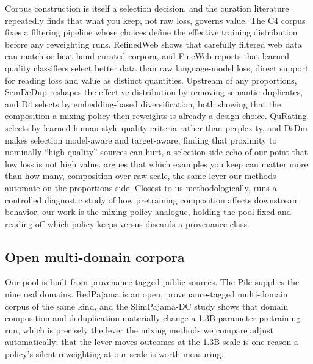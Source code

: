 \documentclass{article}
\begin{document}
Corpus construction is itself a selection decision, and the curation literature repeatedly finds that what you keep, not raw loss, governs value. The C4 corpus \citep{raffel2020t5} fixes a filtering pipeline whose choices define the effective training distribution before any reweighting runs. RefinedWeb \citep{penedo2023refinedweb} shows that carefully filtered web data can match or beat hand-curated corpora, and FineWeb \citep{penedo2024fineweb} reports that learned quality classifiers select better data than raw language-model loss, direct support for reading loss and value as distinct quantities. Upstream of any proportions, SemDeDup \citep{abbas2023semdedup} reshapes the effective distribution by removing semantic duplicates, and D4 \citep{tirumala2023d4} selects by embedding-based diversification, both showing that the composition a mixing policy then reweights is already a design choice. QuRating \citep{wettig2024qurating} selects by learned human-style quality criteria rather than perplexity, and DsDm \citep{engstrom2024dsdm} makes selection model-aware and target-aware, finding that proximity to nominally ``high-quality'' sources can hurt, a selection-side echo of our point that low loss is not high value. \citet{sorscher2022pruning} argues that which examples you keep can matter more than how many, composition over raw scale, the same lever our methods automate on the proportions side. Closest to us methodologically, \citet{longpre2024pretrainersguide} runs a controlled diagnostic study of how pretraining composition affects downstream behavior; our work is the mixing-policy analogue, holding the pool fixed and reading off which policy keeps versus discards a provenance class.

\subsection{Open multi-domain corpora}

Our pool is built from provenance-tagged public sources. The Pile \citep{pile2021} supplies the nine real domains. RedPajama \citep{redpajama2024} is an open, provenance-tagged multi-domain corpus of the same kind, and the SlimPajama-DC study \citep{slimpajamadc2023} shows that domain composition and deduplication materially change a 1.3B-parameter pretraining run, which is precisely the lever the mixing methods we compare adjust automatically; that the lever moves outcomes at the 1.3B scale is one reason a policy's silent reweighting at our scale is worth measuring.
\end{document}
